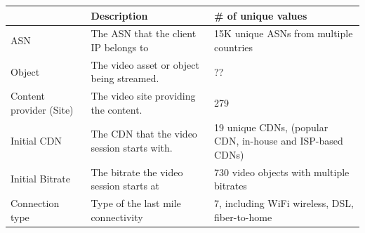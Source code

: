 \begin{table}[h!]
\begin{center}
\begin{small}
\begin{tabular}{p{1.7cm}|p{2.8cm}|p{2.8cm}}
    ~                          & Description                                                       & \# of unique values                                                          \\ \hline
    ASN                        & The ASN that the client IP belongs to  & 15K unique ASNs from multiple countries                                  \\ \hline
    Object                     &  The video asset or object being streamed.                  & ??                                                                           \\ \hline
    Content provider (Site)    & The video site providing the content.                             & 279                                                                          \\ \hline
    Initial CDN                &  	The CDN that the video session starts with.                & 19 unique CDNs, (popular CDN, in-house and ISP-based CDNs) \\ \hline
     Initial Bitrate     &  		The bitrate the video session starts at          & 730 video objects with multiple bitrates                          \\ \hline
     Connection type     &  	Type of the last mile connectivity                         & 7, including WiFi wireless, DSL, fiber-to-home                                    \\
\end{tabular}
\end{small}
\end{center}
\label{tab:attributes}
\end{table}

